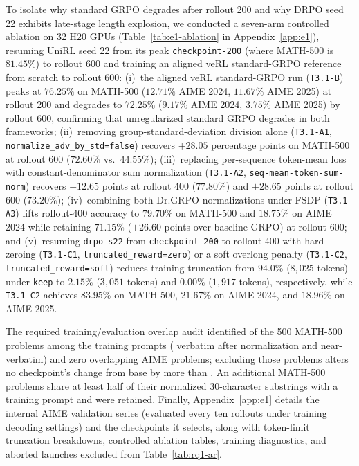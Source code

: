 \documentclass[10pt]{article}
\begin{document}
To isolate why standard GRPO degrades after rollout 200 and why DRPO seed 22 exhibits late-stage length explosion, we conducted a seven-arm controlled ablation on 32 H20 GPUs (Table~\ref{tab:e1-ablation} in Appendix~\ref{app:e1}), resuming UniRL seed 22 from its peak \texttt{checkpoint-200} (where MATH-500 is $81.45\%$) to rollout 600 and training an aligned veRL standard-GRPO reference from scratch to rollout 600:
(i)~the aligned veRL standard-GRPO run (\texttt{T3.1-B}) peaks at $76.25\%$ on MATH-500 ($12.71\%$ AIME 2024, $11.67\%$ AIME 2025) at rollout 200 and degrades to $72.25\%$ ($9.17\%$ AIME 2024, $3.75\%$ AIME 2025) by rollout 600, confirming that unregularized standard GRPO degrades in both frameworks;
(ii)~removing group-standard-deviation division alone (\texttt{T3.1-A1}, \texttt{normalize\_adv\_by\_std=false}) recovers $+28.05$ percentage points on MATH-500 at rollout 600 ($72.60\%$ vs.\ $44.55\%$);
(iii)~replacing per-sequence token-mean loss with constant-denominator sum normalization (\texttt{T3.1-A2}, \texttt{seq-mean-token-sum-norm}) recovers $+12.65$ points at rollout 400 ($77.80\%$) and $+28.65$ points at rollout 600 ($73.20\%$);
(iv)~combining both Dr.GRPO normalizations under FSDP (\texttt{T3.1-A3}) lifts rollout-400 accuracy to $79.70\%$ on MATH-500 and $18.75\%$ on AIME 2024 while retaining $71.15\%$ ($+26.60$ points over baseline GRPO) at rollout 600; and
(v)~resuming \texttt{drpo-s22} from \texttt{checkpoint-200} to rollout 400 with hard zeroing (\texttt{T3.1-C1}, \texttt{truncated\_reward=zero}) or a soft overlong penalty (\texttt{T3.1-C2}, \texttt{truncated\_reward=soft}) reduces training truncation from $94.0\%$ ($8{,}025$ tokens) under \texttt{keep} to $2.15\%$ ($3{,}051$ tokens) and $0.00\%$ ($1{,}917$ tokens), respectively, while \texttt{T3.1-C2} achieves $83.95\%$ on MATH-500, $21.67\%$ on AIME 2024, and $18.96\%$ on AIME 2025.

The required training/evaluation overlap audit identified \EOneOverlapMath{} of the 500 MATH-500 problems among the \EOneTrainPrompts{} training prompts (\EOneOverlapMathVerbatim{} verbatim after normalization and \EOneOverlapMathNear{} near-verbatim) and zero overlapping AIME problems; excluding those \EOneOverlapMath{} problems alters no checkpoint's change from base by more than \EOneOverlapShiftMax{}.
An additional \EOneOverlapTemplate{} MATH-500 problems share at least half of their normalized 30-character substrings with a training prompt and were retained.
Finally, Appendix~\ref{app:e1} details the internal AIME validation series (evaluated every ten rollouts under training decoding settings) and the checkpoints it selects, along with token-limit truncation breakdowns, controlled ablation tables, training diagnostics, and aborted launches excluded from Table~\ref{tab:rq1-ar}.
\end{document}
